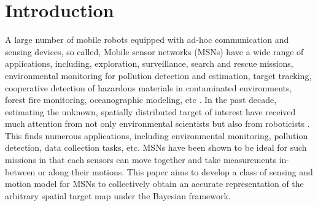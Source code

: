 \documentclass[journal]{IEEEtran}
\begin{document}
%




%
\IEEEpeerreviewmaketitle


\section{Introduction}
\label{sec:sec1}
A large number of mobile robots equipped with ad-hoc communication and sensing devices, so called, Mobile sensor networks (MSNs) have a wide range of applications, including, exploration, surveillance, search and rescue missions, environmental
monitoring for pollution detection and estimation, target tracking, cooperative detection of hazardous materials in contaminated environments, forest fire monitoring, oceanographic modeling, etc \cite{dhillon2003sensor,howard2002mobile,cortes_coverage_2004,yu2005real}. In the past decade, estimating the unknown, spatially distributed target of interest have received much attention from not only environmental scientists \cite{chuvieco1996mapping} but also from roboticists \cite{cortez2008smart,choi2010continuous,ristic2010information}. This finds numerous applications, including environmental monitoring, pollution detection, data collection tasks, etc.
MSNs have been shown to be ideal for such missions in that each sensors can move together and take measurements in-between or along their motions.
This paper aims to develop a class of sensing and motion model for MSNs to collectively obtain an accurate representation of the arbitrary spatial target map under the Bayesian framework.
\end{document}
